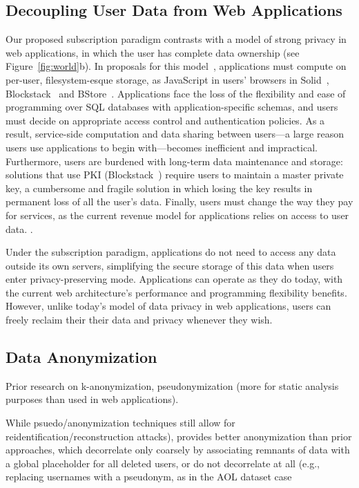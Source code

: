\subsection{Decoupling User Data from Web Applications}
Our proposed subscription paradigm contrasts with a model of strong privacy in web applications, in
which the user has complete data ownership (see Figure~\ref{fig:world}b). In proposals for this
model~\cite{solid, amber, w5, blockstack, bstore}, applications must compute on per-user, filesystem-esque
storage, \eg as JavaScript in users' browsers in Solid~\cite{solid}, Blockstack~\cite{blockstack} and
BStore~\cite{bstore}. Applications face the loss of the flexibility and ease of programming over SQL
databases with application-specific schemas, and users must decide on appropriate access control and
authentication policies. As a result, service-side computation and data sharing between users---a
large reason users use applications to begin with---becomes inefficient and impractical.
%
Furthermore, users are burdened with long-term data maintenance and storage: solutions that use PKI
(\eg Blockstack~\cite{blockstack}) require users to maintain a
master private key, a cumbersome and fragile solution in which losing the key results in permanent
loss of all the user's data.
%
Finally, users must change the way they pay for services, as the current revenue model for
applications relies on access to user data.
.

Under the subscription paradigm, applications do not need to access any data outside its own
servers, simplifying the secure storage of this data when users enter privacy-preserving mode.
Applications can operate as they do today, with the current web architecture's performance and
programming flexibility benefits. However, unlike today's model of data privacy in web applications,
users can freely reclaim their their data and privacy whenever they wish.

\subsection{Data Anonymization}

Prior research on k-anonymization, pseudonymization (more for static analysis purposes than used in
web applications).

While psuedo/anonymization
techniques still allow for reidentification/reconstruction attacks), \name provides better
anonymization than prior approaches, which decorrelate only coarsely by associating remnants of data
with a global placeholder for all deleted users, or do not decorrelate at all (e.g., replacing
usernames with a pseudonym, as in the AOL dataset case~%

